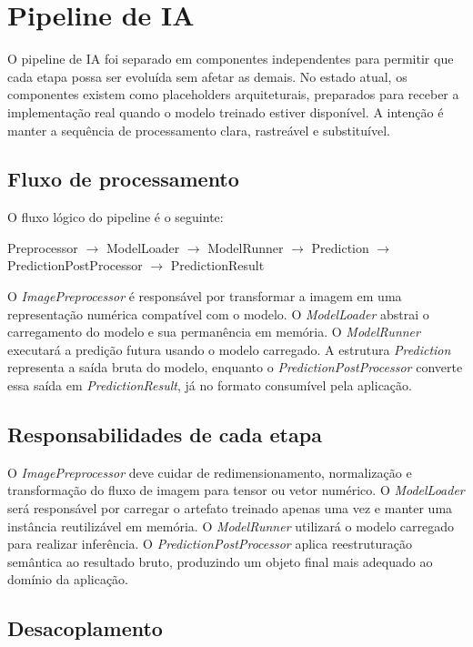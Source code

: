 \chapter{Pipeline de IA}

O pipeline de IA foi separado em componentes independentes para permitir que cada etapa possa ser evoluída sem afetar as demais. No estado atual, os componentes existem como placeholders arquiteturais, preparados para receber a implementação real quando o modelo treinado estiver disponível. A intenção é manter a sequência de processamento clara, rastreável e substituível.

\section{Fluxo de processamento}

O fluxo lógico do pipeline é o seguinte:
\begin{center}
Preprocessor $\rightarrow$ ModelLoader $\rightarrow$ ModelRunner $\rightarrow$ Prediction $\rightarrow$ PredictionPostProcessor $\rightarrow$ PredictionResult
\end{center}

O \textit{ImagePreprocessor} é responsável por transformar a imagem em uma representação numérica compatível com o modelo. O \textit{ModelLoader} abstrai o carregamento do modelo e sua permanência em memória. O \textit{ModelRunner} executará a predição futura usando o modelo carregado. A estrutura \textit{Prediction} representa a saída bruta do modelo, enquanto o \textit{PredictionPostProcessor} converte essa saída em \textit{PredictionResult}, já no formato consumível pela aplicação.

\section{Responsabilidades de cada etapa}

O \textit{ImagePreprocessor} deve cuidar de redimensionamento, normalização e transformação do fluxo de imagem para tensor ou vetor numérico. O \textit{ModelLoader} será responsável por carregar o artefato treinado apenas uma vez e manter uma instância reutilizável em memória. O \textit{ModelRunner} utilizará o modelo carregado para realizar inferência. O \textit{PredictionPostProcessor} aplica reestruturação semântica ao resultado bruto, produzindo um objeto final mais adequado ao domínio da aplicação.

\section{Desacoplamento}

